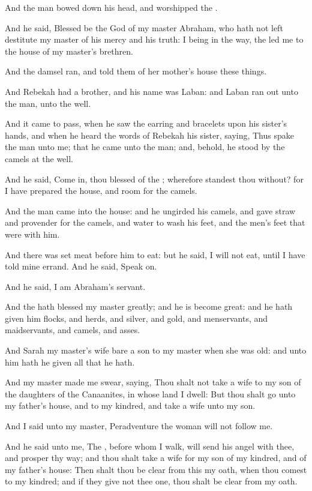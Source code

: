 \verse And the man bowed down his head, and worshipped the \LORD.

\verse And he said, Blessed be the \LORD God of my master Abraham, who
hath not left destitute my master of his mercy and his truth: I being
in the way, the \LORD led me to the house of my master's brethren.

\verse And the damsel ran, and told them of her mother's house these
things.

\verse And Rebekah had a brother, and his name was Laban: and Laban ran
out unto the man, unto the well.

\verse And it came to pass, when he saw the earring and bracelets upon
his sister's hands, and when he heard the words of Rebekah his sister,
saying, Thus spake the man unto me; that he came unto the man; and,
behold, he stood by the camels at the well.

\verse And he said, Come in, thou blessed of the \LORD; wherefore
standest thou without? for I have prepared the house, and room for the
camels.

\verse And the man came into the house: and he ungirded his camels, and
gave straw and provender for the camels, and water to wash his feet,
and the men's feet that were with him.

\verse And there was set meat before him to eat: but he said, I will
not eat, until I have told mine errand. And he said, Speak on.

\verse And he said, I am Abraham's servant.

\verse And the \LORD hath blessed my master greatly; and he is become
great: and he hath given him flocks, and herds, and silver, and gold,
and menservants, and maidservants, and camels, and asses.

\verse And Sarah my master's wife bare a son to my master when she was
old: and unto him hath he given all that he hath.

\verse And my master made me swear, saying, Thou shalt not take a wife
to my son of the daughters of the Canaanites, in whose land I dwell:
\verse But thou shalt go unto my father's house, and to my kindred, and
take a wife unto my son.

\verse And I said unto my master, Peradventure the woman will not
follow me.

\verse And he said unto me, The \LORD, before whom I walk, will send his
angel with thee, and prosper thy way; and thou shalt take a wife for
my son of my kindred, and of my father's house: \verse Then shalt thou
be clear from this my oath, when thou comest to my kindred; and if
they give not thee one, thou shalt be clear from my oath.

